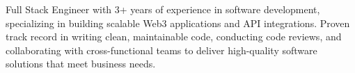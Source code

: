 Full Stack Engineer with 3+ years of experience in software development, specializing in building scalable Web3 applications and API integrations. Proven track record in writing clean, maintainable code, conducting code reviews, and collaborating with cross-functional teams to deliver high-quality software solutions that meet business needs.